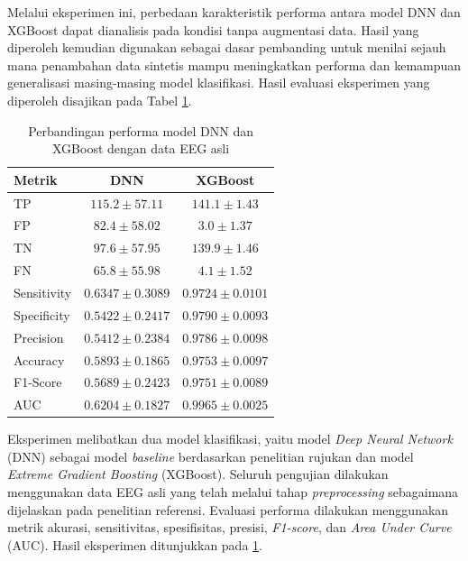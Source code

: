 Melalui eksperimen ini, perbedaan karakteristik performa antara model DNN dan XGBoost dapat dianalisis pada kondisi tanpa augmentasi data. Hasil yang diperoleh kemudian digunakan sebagai dasar pembanding untuk menilai sejauh mana penambahan data sintetis mampu meningkatkan performa dan kemampuan generalisasi masing-masing model klasifikasi. Hasil evaluasi eksperimen yang diperoleh disajikan pada Tabel \ref{tab:ann_xgb_comparison}.

\begin{table}[H]
\centering
\caption{Perbandingan performa model DNN dan XGBoost dengan data EEG asli}
\label{tab:ann_xgb_comparison}
\renewcommand{\arraystretch}{1.2}
\begin{tabular}{lcc}
\toprule
\textbf{Metrik} & \textbf{DNN} & \textbf{XGBoost} \\
\midrule
TP          & $115.2 \pm 57.11$ & $141.1 \pm 1.43$ \\
FP          & $82.4 \pm 58.02$  & $3.0 \pm 1.37$ \\
TN          & $97.6 \pm 57.95$  & $139.9 \pm 1.46$ \\
FN          & $65.8 \pm 55.98$  & $4.1 \pm 1.52$ \\
\midrule
Sensitivity & $0.6347 \pm 0.3089$ & $0.9724 \pm 0.0101$ \\
Specificity & $0.5422 \pm 0.2417$ & $0.9790 \pm 0.0093$ \\
Precision   & $0.5412 \pm 0.2384$ & $0.9786 \pm 0.0098$ \\
Accuracy    & $0.5893 \pm 0.1865$ & $0.9753 \pm 0.0097$ \\
F1-Score    & $0.5689 \pm 0.2423$ & $0.9751 \pm 0.0089$ \\
AUC         & $0.6204 \pm 0.1827$ & $0.9965 \pm 0.0025$ \\
\bottomrule
\end{tabular}
\end{table}


Eksperimen melibatkan dua model klasifikasi, yaitu model \textit{Deep Neural Network} (DNN) sebagai model \textit{baseline} berdasarkan penelitian rujukan dan model \textit{Extreme Gradient Boosting} (XGBoost). Seluruh pengujian dilakukan menggunakan data EEG asli yang telah melalui tahap \textit{preprocessing} sebagaimana dijelaskan pada penelitian referensi. Evaluasi performa dilakukan menggunakan metrik akurasi, sensitivitas, spesifisitas, presisi, \textit{F1-score}, dan \textit{Area Under Curve} (AUC). Hasil eksperimen ditunjukkan pada \ref{tab:ann_xgb_comparison}.

